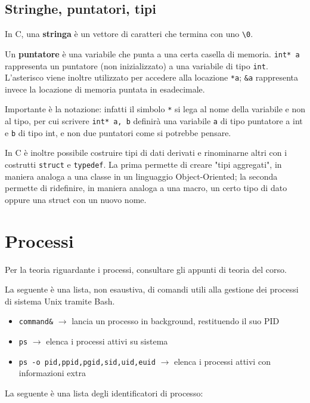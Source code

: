 \documentclass[11pt]{article}
\begin{document}
\subsection{Stringhe, puntatori, tipi}

In C, una \textbf{stringa} è un vettore di caratteri che termina con uno \verb|\0|.

Un \textbf{puntatore} è una variabile che punta a una certa casella di memoria. \verb|int* a| rappresenta un puntatore (non inizializzato) a una variabile di tipo \verb|int|. L'asterisco viene inoltre utilizzato per accedere alla locazione \verb|*a|; \verb|&a| rappresenta invece la locazione di memoria puntata in esadecimale.

Importante è la notazione: infatti il simbolo \verb|*| si lega al nome della variabile e non al tipo, per cui scrivere \verb|int* a, b| definirà una variabile \verb|a| di tipo puntatore a int e \verb|b| di tipo int, e non due puntatori come si potrebbe pensare.

In C è inoltre possibile costruire tipi di dati derivati e rinominarne altri con i costrutti \verb|struct| e \verb|typedef|. La prima permette di creare "tipi aggregati", in maniera analoga a una classe in un linguaggio Object-Oriented; la seconda permette di ridefinire, in maniera analoga a una macro, un certo tipo di dato oppure una struct con un nuovo nome.

\section{Processi}

Per la teoria riguardante i processi, consultare gli appunti di teoria del corso.

La seguente è una lista, non esaustiva, di comandi utili alla gestione dei processi di sistema Unix tramite Bash.

\begin{itemize}
    \item \verb|command&| $\rightarrow$ lancia un processo in background, restituendo il suo PID
    \item \verb|ps| $\rightarrow$ elenca i processi attivi su sistema
    \item \verb|ps -o pid,ppid,pgid,sid,uid,euid| $\rightarrow$ elenca i processi attivi con informazioni extra
\end{itemize}

La seguente è una lista degli identificatori di processo:
\end{document}
